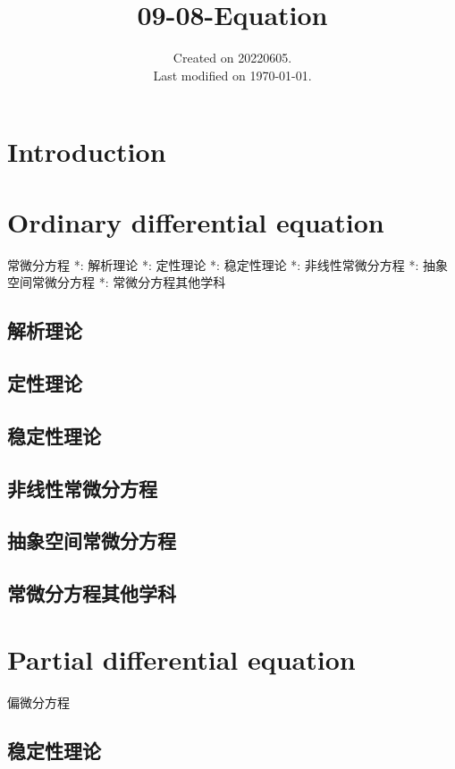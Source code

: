 \documentclass[UTF8]{../09-Mathematics}
\begin{document}
\title{09-08-Equation}
\date{Created on 20220605.\\   Last modified on \today.}
\maketitle
\tableofcontents


\chapter{Introduction}


\chapter{Ordinary differential equation}

常微分方程
*: 解析理论
*: 定性理论
*: 稳定性理论
*: 非线性常微分方程
*: 抽象空间常微分方程
*: 常微分方程其他学科


\section{解析理论}
\section{定性理论}
\section{稳定性理论}
\section{非线性常微分方程}
\section{抽象空间常微分方程}
\section{常微分方程其他学科}



\chapter{Partial differential equation}
偏微分方程


\section{稳定性理论}
\end{document}
